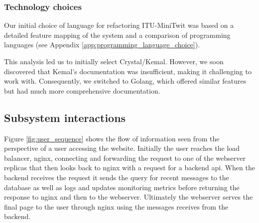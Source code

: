 \subsubsection*{Technology choices}%


Our initial choice of language for refactoring ITU-MiniTwit was based on a detailed feature mapping of the system and a comparison of programming languages (see Appendix \ref{app:programming_language_choice}). 

This analysis led us to initially select Crystal/Kemal. However, we soon discovered that Kemal's documentation was insufficient, making it challenging to work with. Consequently, we switched to Golang, which offered similar features but had much more comprehensive documentation.





\subsection{Subsystem interactions}


Figure \ref{fig:user_sequence} shows the flow of information seen from the perspective of a user accessing the website. Initially the user reaches the load balancer, nginx, connecting and forwarding the request to one of the webserver replicas that then looks back to nginx with a request for a backend api. When the backend receives the request it sends the query for recent messages to the database as well as logs and updates monitoring metrics before returning the response to nginx and then to the webserver. Ultimately the webserver serves the final page to the user through nginx using the messages receives from the backend.


